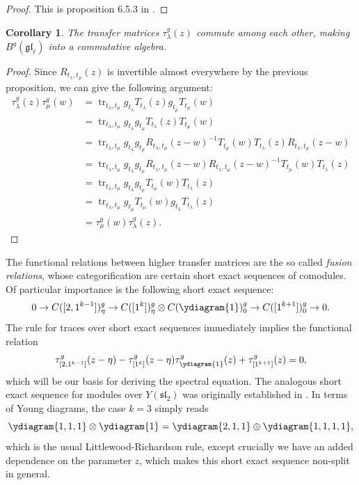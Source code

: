 \documentclass[11pt]{report}
\newtheorem{corollary}[theorem]{Corollary}
\theoremstyle{definition}
\theoremstyle{remark}
\theoremstyle{remark}
\begin{document}
\begin{proof}
This is proposition 6.5.3 in \cite{book:molev}.
\end{proof}

\begin{corollary}
The transfer matrices $\tau_\lambda^g(z)$ commute among each other, making $B^g(\mathfrak{gl}_\ell)$ into a commutative algebra.
\end{corollary}

\begin{proof}
Since $R_{t_\lambda,t_\mu}(z)$ is invertible almost everywhere by the previous proposition, we can give the following argument:
\begin{align*}
\tau_\lambda^g(z) \tau_\mu^g(w)
&= \operatorname{tr}_{t_\lambda,t_\mu} g_{t_\lambda} T_{t_\lambda}(z) g_{t_\mu} T_{t_\mu}(w) \\
&= \operatorname{tr}_{t_\lambda,t_\mu} g_{t_\lambda} g_{t_\mu} T_{t_\lambda}(z) T_{t_\mu}(w) \\
&= \operatorname{tr}_{t_\lambda,t_\mu} g_{t_\lambda} g_{t_\mu} R_{t_\lambda,t_\mu}(z-w)^{-1} T_{t_\mu}(w) T_{t_\lambda}(z) R_{t_\lambda,t_\mu}(z-w) \\
&= \operatorname{tr}_{t_\lambda,t_\mu} g_{t_\lambda} g_{t_\mu} R_{t_\lambda,t_\mu}(z-w) R_{t_\lambda,t_\mu}(z-w)^{-1} T_{t_\mu}(w) T_{t_\lambda}(z) \\
&= \operatorname{tr}_{t_\lambda,t_\mu} g_{t_\lambda} g_{t_\mu} T_{t_\mu}(w) T_{t_\lambda}(z) \\
&= \operatorname{tr}_{t_\lambda,t_\mu} g_{t_\mu} T_{t_\mu}(w) g_{t_\lambda} T_{t_\lambda}(z) \\
&= \tau_\mu^g(w) \tau_\lambda^g(z).
\end{align*}
\end{proof}

The functional relations between higher transfer matrices are the so called \emph{fusion relations}, whose categorification are certain short exact sequences of comodules. Of particular importance is the following short exact sequence:
\begin{equation*}
0 \to C([2,1^{k-1}])_\eta^g \to C([1^k])_\eta^g \otimes C(\ydiagram{1})_0^g \to C([1^{k+1}])_0^g \to 0.
\end{equation*}
The rule for traces over short exact sequences immediately implies the functional relation
\begin{equation*}\label{equation:functionalRelation}
\tau_{[2,1^{k-1}]}^g(z-\eta) - \tau_{[1^k]}^g(z-\eta) \tau_{\ydiagram{1}}^g(z) + \tau_{[1^{k+1}]}^g(z) = 0,
\end{equation*}
which will be our basis for deriving the spectral equation. The analogous short exact sequence for modules over $Y(\mathfrak{sl}_2)$ was originally established in \cite{article:chari:1990}. In terms of Young diagrams, the case $k=3$ simply reads
\begin{equation*}
\ydiagram{1,1,1} \otimes \ydiagram{1} = \ydiagram{2,1,1} \oplus \ydiagram{1,1,1,1},
\end{equation*}
which is the usual Littlewood-Richardson rule, except crucially we have an added dependence on the parameter $z$, which makes this short exact sequence non-split in general.
\end{document}
